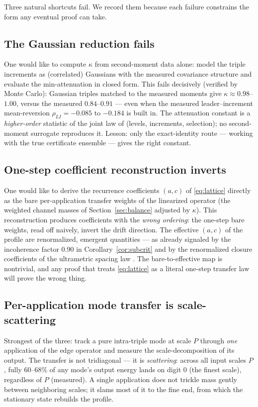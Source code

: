 \documentclass[11pt]{article}
\theoremstyle{definition}
\theoremstyle{remark}
\newcommand{\kap}{\kappa}
\begin{document}
Three natural shortcuts fail. We record them because each failure
constrains the form any eventual proof can take.

\subsection{The Gaussian reduction fails}

One would like to compute $\kap$ from second-moment data alone: model the
triple increments as (correlated) Gaussians with the measured covariance
structure and evaluate the min-attenuation in closed form. This fails
decisively (verified by Monte Carlo): Gaussian triples matched to the
measured moments give $\kap \approx 0.98$--$1.00$, versus the measured
$0.84$--$0.91$ --- even when the measured leader--increment mean-reversion
$\rho_{LI} = -0.085$ to $-0.184$ is built in. The attenuation constant is
a \emph{higher-order} statistic of the joint law of (levels, increments,
selection); no second-moment surrogate reproduces it. Lesson: only the
exact-identity route --- working with the true certificate ensemble ---
gives the right constant.

\subsection{One-step coefficient reconstruction inverts}

One would like to derive the recurrence coefficients $(a, c)$ of
\eqref{eq:lattice} directly as the bare per-application transfer weights
of the linearized operator (the weighted channel masses of
Section~\ref{sec:balance} adjusted by $\kap$). This reconstruction
produces coefficients with the \emph{wrong ordering}: the one-step bare
weights, read off naively, invert the drift direction. The effective
$(a, c)$ of the profile are renormalized, emergent quantities --- as
already signaled by the incoherence factor $0.90$ in
Corollary~\ref{cor:subcrit} and by the renormalized closure coefficients
of the ultrametric spacing law \cite{Temp26}. The bare-to-effective map is
nontrivial, and any proof that treats \eqref{eq:lattice} as a literal
one-step transfer law will prove the wrong thing.

\subsection{Per-application mode transfer is scale-scattering}

Strongest of the three: track a pure intra-triple mode at scale $P$
through \emph{one} application of the edge operator and measure the
scale-decomposition of its output. The transfer is not tridiagonal ---
it is \emph{scattering}: across all input scales $P$, fully
$60$--$68\%$ of any mode's output energy lands on digit $0$ (the finest
scale), regardless of $P$ (measured). A single application does not
trickle mass gently between neighboring scales; it slams most of it to
the fine end, from which the stationary state rebuilds the profile.
\end{document}
